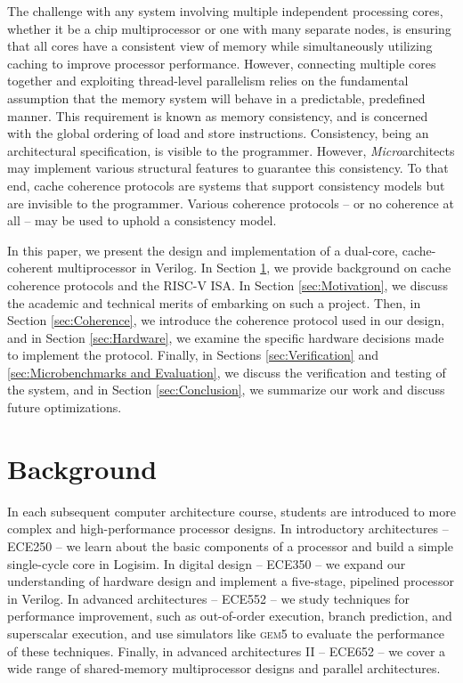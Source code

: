 \documentclass[10pt, compsoc]{IEEEtran}
\begin{document}
The challenge with any system involving multiple independent processing cores, whether it be a chip multiprocessor or one with many separate nodes, is ensuring that all cores have a consistent view of memory while simultaneously utilizing caching to improve processor performance. However, connecting multiple cores together and exploiting thread-level parallelism relies on the fundamental assumption that the memory system will behave in a predictable, predefined manner. This requirement is known as memory consistency, and is concerned with the global ordering of load and store instructions. Consistency, being an architectural specification, is visible to the programmer. However, \textit{Micro}architects may implement various structural features to guarantee this consistency. To that end, cache coherence protocols are systems that support consistency models but are invisible to the programmer. Various coherence protocols -- or no coherence at all -- may be used to uphold a consistency model. 



In this paper, we present the design and implementation of a dual-core, cache-coherent multiprocessor in Verilog. In Section \ref{sec:Background}, we provide background on cache coherence protocols and the RISC-V ISA. In Section \ref{sec:Motivation}, we discuss the academic and technical merits of embarking on such a project. Then, in Section \ref{sec:Coherence}, we introduce the coherence protocol used in our design, and in Section \ref{sec:Hardware}, we examine the specific hardware decisions made to implement the protocol. Finally, in Sections \ref{sec:Verification} and \ref{sec:Microbenchmarks and Evaluation}, we discuss the verification and testing of the system, and in Section \ref{sec:Conclusion}, we summarize our work and discuss future optimizations. 





\section{Background}\label{sec:Background}

In each subsequent computer architecture course, students are introduced to more complex and high-performance processor designs. In introductory architectures -- ECE250 -- we learn about the basic components of a processor and build a simple single-cycle core in Logisim. In digital design -- ECE350 -- we expand our understanding of hardware design and implement a five-stage, pipelined processor in Verilog. In advanced architectures -- ECE552 -- we study techniques for performance improvement, such as out-of-order execution, branch prediction, and superscalar execution, and use simulators like \textsc{gem5} to evaluate the performance of these techniques. Finally, in advanced architectures II -- ECE652 -- we cover a wide range of shared-memory multiprocessor designs and parallel architectures. 
\end{document}
